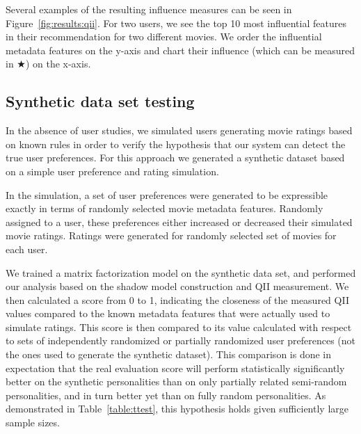 Several examples of the resulting influence measures can be seen in
Figure~\ref{fig:results:qii}. 
For two users, we see the top 10 most influential features in their
recommendation for two different movies.
We order the influential metadata features on the y-axis and chart
their influence (which can be measured in $\bigstar$) on the x-axis. 

\subsection{Synthetic data set testing}

In the absence of user studies, we simulated users generating movie
ratings based on known rules in order to verify the hypothesis that
our system can detect the true user preferences. 
For this approach we generated a synthetic dataset based on a simple
user preference and rating simulation.

In the simulation, a set of user preferences were generated to be
expressible exactly in terms of randomly selected movie metadata
features.
Randomly assigned to a user, these preferences either increased or
decreased their simulated movie ratings. 
Ratings were generated for randomly selected set of movies for each
user.

We trained a matrix factorization model on the synthetic data set, and
performed our analysis based on the shadow model construction and QII
measurement.
We then calculated a score from 0 to 1, indicating the closeness of
the measured QII values compared to the known metadata features that
were actually used to simulate ratings.
This score is then compared to its value calculated with respect to
sets of independently randomized or partially randomized user
preferences (not the ones used to generate the synthetic dataset). 
This comparison is done in expectation that the real evaluation score
will perform statistically significantly better on the synthetic
personalities than on only partially related semi-random
personalities, and in turn better yet than on fully random
personalities.
As demonstrated in Table~\ref{table:ttest}, this hypothesis holds
given sufficiently large sample sizes.

